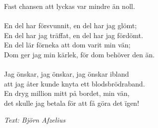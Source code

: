 Fast chansen att lyckas var mindre än noll.\\
\\
En del har försvunnit, en del har jag glömt;\\
En del har jag träffat, en del har jag fördömt.\\
En del lär förneka att dom varit min vän;\\
Dom ger jag min kärlek, för dom behöver den än.\\
\\
Jag önskar, jag önskar, jag önskar ibland\\
att jag åter kunde knyta ett blodsbrödraband.\\
En dryg million mitt på bordet, min vän,\\
det skulle jag betala för att få göra det ïgen!
\par
\vspace{10pt}
{\footnotesize\textit{Text: Björn Afzelius}}
